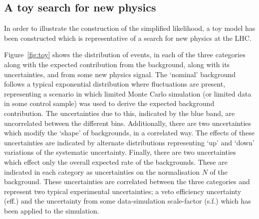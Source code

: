 \documentclass[11pt]{article}
\begin{document}


\subsection{A toy search for new physics}
\label{se:toy_search}

In order to illustrate the construction of the simplified likelihood, a toy model has been constructed which is representative of a search for new physics at the LHC.

Figure~\ref{fig:toy} shows the distribution of events, in each of the three categories along with the expected contribution from the background, along with its uncertainties, and from some new physics signal.
The `nominal' background follows a typical exponential distribution where fluctuations are present, representing a scenario in which limited Monte Carlo simulation (or limited data in some control sample) was used
to derive the expected background contribution. The uncertainties due to this, indicated by the blue band, are uncorrelated between the different bins. Additionally, there are two uncertainties which modify the `shape' of
backgrounds, in a correlated way. The effects of these uncertainties are indicated by alternate distributions representing `up' and `down' variations of the systematic uncertainty. Finally, there are two uncertainties
which effect only the overall expected rate of the backgrounds. These are indicated in each category as uncertainties on the normalisation $N$ of the background. These uncertainties are correlated between the three categories
and represent two typical experimental uncertainties; a veto efficiency uncertainty (eff.) and the uncertainty from some data-simulation scale-factor (s.f.) which has been applied to the simulation.
\end{document}
